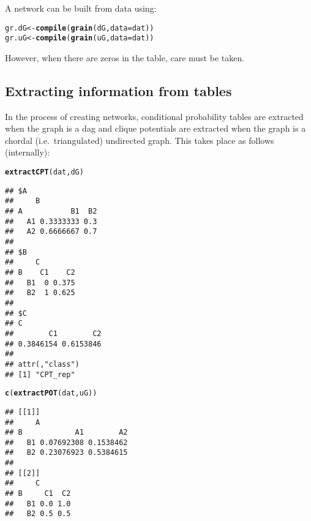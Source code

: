 \documentclass[10pt]{article}\usepackage[]{graphicx}\usepackage[]{color}
\makeatletter
\newcommand{\hlstd}[1]{\textcolor[rgb]{0.345,0.345,0.345}{#1}}%
\newcommand{\hlkwb}[1]{\textcolor[rgb]{0.69,0.353,0.396}{#1}}%
\newcommand{\hlkwc}[1]{\textcolor[rgb]{0.333,0.667,0.333}{#1}}%
\newcommand{\hlkwd}[1]{\textcolor[rgb]{0.737,0.353,0.396}{\textbf{#1}}}%
\newenvironment{kframe}{%
 \def\at@end@of@kframe{}%
 \ifinner\ifhmode%
  \def\at@end@of@kframe{\end{minipage}}%
  \begin{minipage}{\columnwidth}%
 \fi\fi%
 \def\FrameCommand##1{\hskip\@totalleftmargin \hskip-\fboxsep
 \colorbox{shadecolor}{##1}\hskip-\fboxsep
     \hskip-\linewidth \hskip-\@totalleftmargin \hskip\columnwidth}%
 \MakeFramed {\advance\hsize-\width
   \@totalleftmargin\z@ \linewidth\hsize
   \@setminipage}}%
 {\par\unskip\endMakeFramed%
 \at@end@of@kframe}
\newenvironment{knitrout}{}{} %
\makeatother
\begin{document}
A network can be built from data using:

\begin{knitrout}
\color{fgcolor}\begin{kframe}
\begin{alltt}
\hlstd{gr.dG} \hlkwb{<-} \hlkwd{compile}\hlstd{(} \hlkwd{grain}\hlstd{( dG,} \hlkwc{data}\hlstd{=dat ) )}
\hlstd{gr.uG} \hlkwb{<-} \hlkwd{compile}\hlstd{(} \hlkwd{grain}\hlstd{( uG,} \hlkwc{data}\hlstd{=dat ) )}
\end{alltt}
\end{kframe}
\end{knitrout}

However, when there are zeros in the table, care must be taken.

\subsection{Extracting information from tables}
\label{sec:extr-inform-from}

In the process of creating networks, conditional probability tables
are extracted when the graph is a dag and clique potentials are
extracted when the graph is a chordal (i.e.\ triangulated) undirected
graph. This takes place as follows (internally):

\begin{knitrout}
\color{fgcolor}\begin{kframe}
\begin{alltt}
\hlkwd{extractCPT}\hlstd{(dat, dG)}
\end{alltt}
\begin{verbatim}
## $A
##     B
## A           B1  B2
##   A1 0.3333333 0.3
##   A2 0.6666667 0.7
## 
## $B
##     C
## B    C1    C2
##   B1  0 0.375
##   B2  1 0.625
## 
## $C
## C
##        C1        C2 
## 0.3846154 0.6153846 
## 
## attr(,"class")
## [1] "CPT_rep"
\end{verbatim}
\begin{alltt}
\hlkwd{c}\hlstd{(}\hlkwd{extractPOT}\hlstd{(dat, uG ))}
\end{alltt}
\begin{verbatim}
## [[1]]
##     A
## B            A1        A2
##   B1 0.07692308 0.1538462
##   B2 0.23076923 0.5384615
## 
## [[2]]
##     C
## B     C1  C2
##   B1 0.0 1.0
##   B2 0.5 0.5
\end{verbatim}
\end{kframe}
\end{knitrout}
\end{document}

